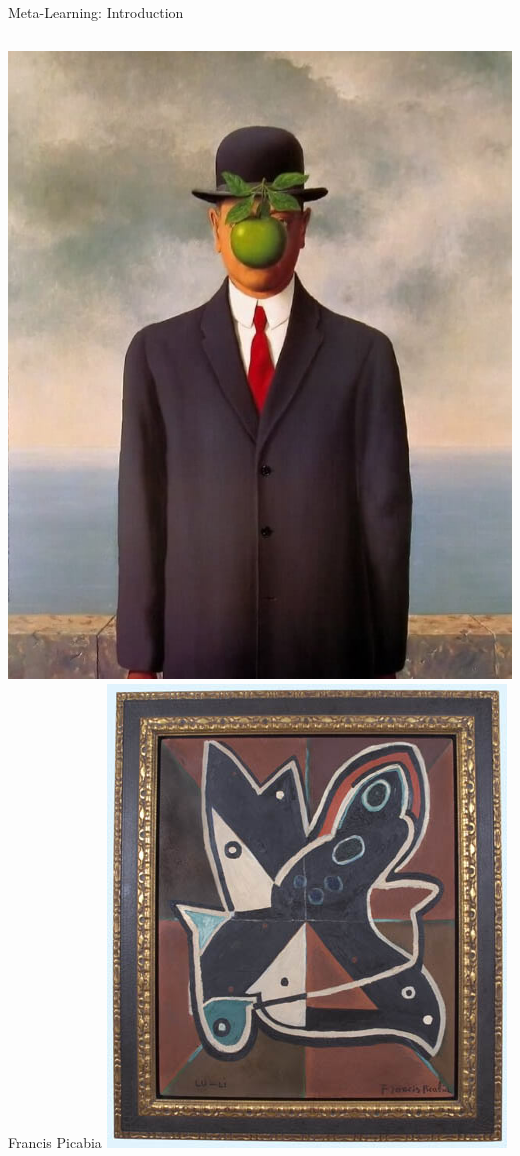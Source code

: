 \begin{frame}[c]{Meta-Learning: Introduction}
\begin{columns}
	\includegraphics[width=1.0\textwidth]{w07_hpo_grey_box/images/meta_learning/magritte_2.jpg}
	Francis Picabia
	\centering
	\includegraphics[width=.8\textwidth]{w07_hpo_grey_box/images/meta_learning/picabia_3.jpg}

\end{columns}
\end{frame}
